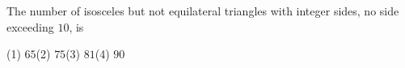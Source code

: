 The number of isosceles but not equilateral triangles with integer sides, no side exceeding $10$, is

(1) $65$\qquad (2) $75$\qquad (3) $81$\qquad (4) $90$
